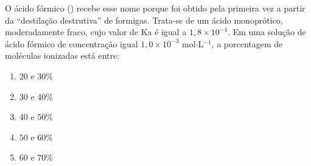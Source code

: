 O ácido fórmico () recebe esse nome porque foi obtido pela primeira vez a partir da “destilação destrutiva” de formigas.
Trata-se de um ácido monoprótico, moderadamente fraco, cujo valor de Ka é igual a $1,8 \times 10^{-4}$. Em uma solução de ácido fórmico de concentração igual $1,0 \times 10^{-3}$ mol$\cdot$L$^{-1}$, a porcentagem de moléculas ionizadas está entre:

\begin{enumerate}[label = (\alph*)]
	\item $20$ e $30 \%$
	\item $30$ e $40 \%$
	\item $40$ e $50 \%$
	\item $50$ e $60 \%$
	\item $60$ e $70 \%$
\end{enumerate}
